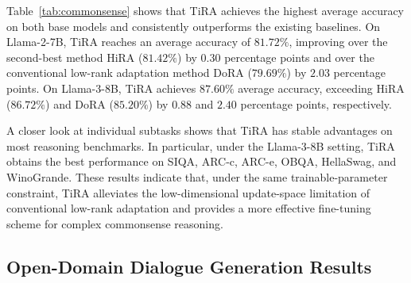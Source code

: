 \documentclass[a4paper,11pt]{article}
\begin{document}
Table~\ref{tab:commonsense} shows that TiRA achieves the highest average accuracy on both base models and consistently outperforms the existing baselines. On Llama-2-7B, TiRA reaches an average accuracy of $81.72\%$, improving over the second-best method HiRA ($81.42\%$) by $0.30$ percentage points and over the conventional low-rank adaptation method DoRA ($79.69\%$) by $2.03$ percentage points. On Llama-3-8B, TiRA achieves $87.60\%$ average accuracy, exceeding HiRA ($86.72\%$) and DoRA ($85.20\%$) by $0.88$ and $2.40$ percentage points, respectively.

A closer look at individual subtasks shows that TiRA has stable advantages on most reasoning benchmarks. In particular, under the Llama-3-8B setting, TiRA obtains the best performance on SIQA, ARC-c, ARC-e, OBQA, HellaSwag, and WinoGrande. These results indicate that, under the same trainable-parameter constraint, TiRA alleviates the low-dimensional update-space limitation of conventional low-rank adaptation and provides a more effective fine-tuning scheme for complex commonsense reasoning.

\subsection{Open-Domain Dialogue Generation Results}

\begin{table}[H]
\centering
\small
\caption{Performance comparison of PEFT methods on the ConvAI2 open-domain dialogue generation dataset. Baseline results except TiRA are taken from HiRA. The best results are shown in bold.}
\label{tab:dialogue}
\end{table}
\end{document}
